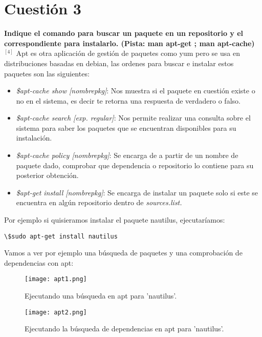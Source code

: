 \documentclass[a4paper, 11pt]{article} %
\begin{document}
\section{Cuestión 3}
\textbf{Indique el comando para buscar un paquete en un repositorio y el correspondiente para instalarlo. (Pista: man apt-get ; man apt-cache)}\\
$^{[4]}$ Apt es otra aplicación de gestión de paquetes como yum pero se usa en distribuciones basadas en debian, las ordenes para buscar e instalar estos paquetes son las siguientes:
\begin{itemize}
\item \textit{\$apt-cache show [nombrepkg]}: Nos muestra si el paquete en cuestión existe o no en el sistema, es decir te retorna una respuesta de verdadero o falso.
\item \textit{\$apt-cache search [exp. regular]}: Nos permite realizar una consulta sobre el sistema para saber los paquetes que se encuentran disponibles para su instalación.
\item \textit{\$apt-cache policy [nombrepkg]}: Se encarga de a partir de un nombre de paquete dado, comprobar que dependencia o repositorio lo contiene para su posterior obtención.
\item \textit{\$apt-get install [nombrepkg]}: Se encarga de instalar un paquete solo si este se encuentra en algún repositorio dentro de \textit{sources.list.}
\end{itemize}

Por ejemplo si quisieramos instalar el paquete nautilus, ejecutaríamos:
\begin{verbatim}
\$sudo apt-get install nautilus
\end{verbatim}

\pagebreak

Vamos a ver por ejemplo una búsqueda de paquetes y una comprobación de dependencias con apt:
\begin{figure}[h]
\centering 
\texttt{[image: apt1.png]} 
\caption{Ejecutando una búsqueda en apt para 'nautilus'.} 
\vspace{-0.5cm}
\label{contexto:figura} 
\end{figure}

\begin{figure}[h]
\centering 
\texttt{[image: apt2.png]} 
\caption{Ejecutando la búsqueda de dependencias en apt para 'nautilus'.} 
\vspace{-0.5cm}
\label{contexto:figura} 
\end{figure}
\end{document}
